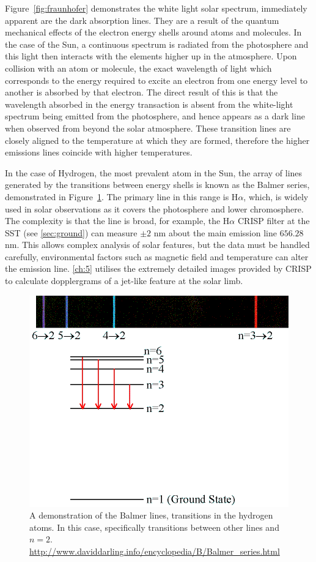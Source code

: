 Figure~\ref{fig:fraunhofer} demonstrates the white light solar spectrum, immediately apparent are the dark absorption lines.
They are a result of the quantum mechanical effects of the electron energy shells around atoms and molecules.
In the case of the Sun, a continuous spectrum is radiated from the photosphere and this light then interacts with the elements higher up in the atmosphere.
Upon collision with an atom or molecule, the exact wavelength of light which corresponds to the energy required to excite an electron from one energy level to another is absorbed by that electron.
The direct result of this is that the wavelength absorbed in the energy transaction is absent from the white-light spectrum being emitted from the photosphere, and hence appears as a dark line when observed from beyond the solar atmosphere.
These transition lines are closely aligned to the temperature at which they are formed, therefore the higher emissions lines coincide with higher temperatures.

In the case of Hydrogen, the most prevalent atom in the Sun, the array of lines generated by the transitions between energy shells is known as the Balmer series, demonstrated in Figure~\ref{fig:balmer}.
The primary line in this range is H$\alpha$, which, is widely used in solar observations as it covers the photosphere and lower chromosphere.
The complexity is that the line is broad, for example, the H$\alpha$ CRISP filter at the SST (see \ref{sec:ground}) can measure $\pm 2$ nm about the main emission line $656.28$ nm.
This allows complex analysis of solar features, but the data must be handled carefully, environmental factors such as magnetic field and temperature can alter the emission line.
\ref{ch:5} utilises the extremely detailed images provided by CRISP to calculate dopplergrams of a jet-like feature at the solar limb.

\begin{figure}
	\centering
	\includegraphics[scale=0.5]{Chapter1/Figs/Balmer_series}
	\caption{A demonstration of the Balmer lines, transitions in the hydrogen atoms. In this case, specifically transitions between other lines and $n = 2$.
		\url{http://www.daviddarling.info/encyclopedia/B/Balmer_series.html}}
	\label{fig:balmer}
\end{figure}

